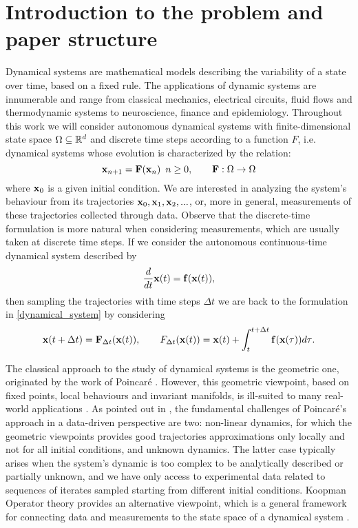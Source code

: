 \section{Introduction to the problem and paper structure}
Dynamical systems are mathematical models describing the variability of a state over time, based on a fixed rule. The applications of dynamic systems are innumerable and range from classical mechanics, electrical circuits, fluid flows and thermodynamic systems to neuroscience, finance and epidemiology. Throughout this work we will consider autonomous dynamical systems with finite-dimensional state space $\Omega\subseteq\mathbb{R}^d$ and discrete time steps according to a function $F$, i.e. dynamical systems whose evolution is characterized by the relation:
\begin{equation}
    \label{dynamical_system}
    \vb{x}_{n+1} = \vb{F}(\vb{x}_n)\,\,\,n\geq 0, \qquad \vb{F}:\Omega \to \Omega
\end{equation}
where $\vb{x}_0$ is a given initial condition. We are interested in analyzing the system's behaviour from its trajectories $\vb{x}_0, \vb{x}_1, \vb{x}_2,...$, or, more in general, measurements of these trajectories collected through data. Observe that the discrete-time formulation is more natural when considering measurements, which are usually taken at discrete time steps. If we consider the autonomous continuous-time dynamical system described by
\begin{equation*}
    \frac{d}{dt}\vb{x}(t) = \vb{f}(\vb{x}(t)),
\end{equation*}
then sampling the trajectories with time steps $\Delta t$ we are back to the formulation in \eqref{dynamical_system} by considering
\begin{equation}
    \label{continuous_to_discrete}
    \vb{x}(t+\Delta t) = \vb{F}_{\Delta t}(\vb{x}(t)), \qquad \vb\vb{F}_{\Delta t}(\vb{x}(t)) = \vb{x}(t) + \int_{t}^{t+\Delta t}{\vb{f}(\vb{x}(\tau)) d\tau}.
\end{equation}

The classical approach to the study of dynamical systems is the geometric one, originated by the work of Poincaré \cite{henri_poincare_les_1899}. However, this geometric viewpoint, based on fixed points, local behaviours and invariant manifolds, is ill-suited to many real-world applications \cite{budisic_applied_2012}. As pointed out in \cite{colbrook_rigorous_2021}, the fundamental challenges of Poincaré's approach in a data-driven perspective are two: non-linear dynamics, for which the geometric viewpoints provides good trajectories approximations only locally and not for all initial conditions, and unknown dynamics. The latter case typically arises when the system's dynamic is too complex to be analytically described or partially unknown, and we have only access to experimental data related to sequences of iterates sampled starting from different initial conditions. Koopman Operator theory \cite{koopman_dynamical_1932, koopman_hamiltonian_1931} provides an alternative viewpoint, which is a general framework for connecting data and measurements to the state space of a dynamical system \cite{arbabi_introduction_2018}.
